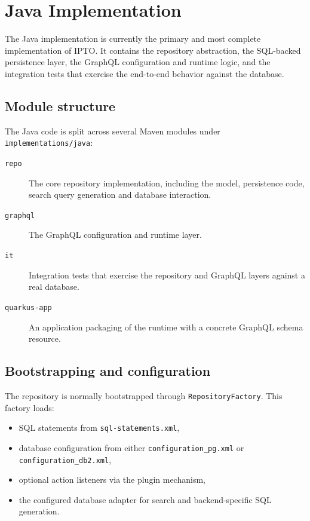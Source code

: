 \section{Java Implementation}
\label{sec:JavaImplementation}

The Java implementation is currently the primary and most complete implementation of IPTO. It contains the repository abstraction, the SQL-backed persistence layer, the GraphQL configuration and runtime logic, and the integration tests that exercise the end-to-end behavior against the database.

\subsection{Module structure}

The Java code is split across several Maven modules under \texttt{implementations/java}:
\begin{description}
\item[\texttt{repo}] The core repository implementation, including the model, persistence code, search query generation and database interaction.
\vspace{.2cm}
\item[\texttt{graphql}] The GraphQL configuration and runtime layer.
\vspace{.2cm}
\item[\texttt{it}] Integration tests that exercise the repository and GraphQL layers against a real database.
\vspace{.2cm}
\item[\texttt{quarkus-app}] An application packaging of the runtime with a concrete GraphQL schema resource.
\end{description}

\subsection{Bootstrapping and configuration}

The repository is normally bootstrapped through \texttt{RepositoryFactory}. This factory loads:
\begin{itemize}
\item SQL statements from \texttt{sql-statements.xml},
\item database configuration from either \texttt{configuration\_pg.xml} or \texttt{configuration\_db2.xml},
\item optional action listeners via the plugin mechanism,
\item the configured database adapter for search and backend-specific SQL generation.
\end{itemize}


